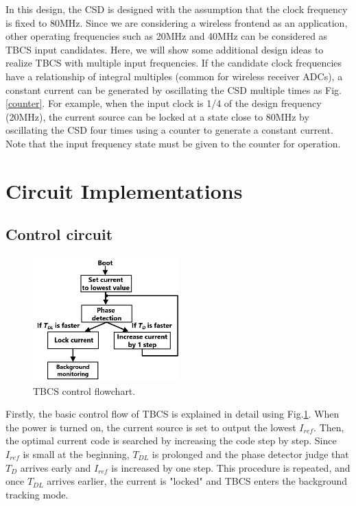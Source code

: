 \documentclass[letterpaper, 10 pt, conference]{ieeeconf}  %
\begin{document}
In this design, the CSD is designed with the assumption that the clock frequency is fixed to 80MHz. Since we are considering a wireless frontend as an application, other operating frequencies such as 20MHz and 40MHz can be considered as TBCS input candidates. %
Here, we will show some additional design ideas to realize TBCS with multiple input frequencies. If the candidate clock frequencies have a relationship of integral multiples (common for wireless receiver ADCs), a constant current can be generated by oscillating the CSD multiple times as Fig.\ref{counter}. For example, when the input clock is 1/4 of the design frequency (20MHz), the current source can be locked at a state close to 80MHz by oscillating the CSD four times using a counter to generate a constant current. Note that the input frequency state must be given to the counter for operation.


\section{Circuit Implementations}
\subsection{Control circuit}
\begin{figure}[!]
\centering
 \includegraphics[width=0.5\textwidth]{figs/flowchart.png}
  \caption{TBCS control flowchart.}
\label{flow}
\end{figure}
Firstly, the basic control flow of TBCS is explained in detail using Fig.\ref{flow}. When the power is turned on, the current source is set to output the lowest $I_{ref}$. Then, the optimal current code is searched by increasing the code step by step. Since $I_{ref}$ is small at the beginning, $T_{DL}$ is prolonged and the phase detector judge that $T_D$ arrives early and $I_{ref}$ is increased by one step. This procedure is repeated, and once $T_{DL}$ arrives earlier, the current is "locked" and TBCS enters the background tracking mode.
\end{document}
